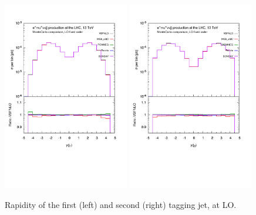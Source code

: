 \documentclass[a4paper,10pt]{report}
\begin{document}
\begin{figure}[h!]
   \centering
   \includegraphics[width=0.49\textwidth,angle=0,clip=true,trim={0.4cm 2.5cm 0.6cm 1.cm}]{figures/yj1_LO.pdf}
   \includegraphics[width=0.49\textwidth,angle=0,clip=true,trim={0.4cm 2.5cm 0.6cm 1.cm}]{figures/yj2_LO.pdf}
\caption{\label{fig:yj1-2LO}Rapidity of the first (left) and second (right) tagging jet, at LO.
}
\end{figure}
%
\end{document}
